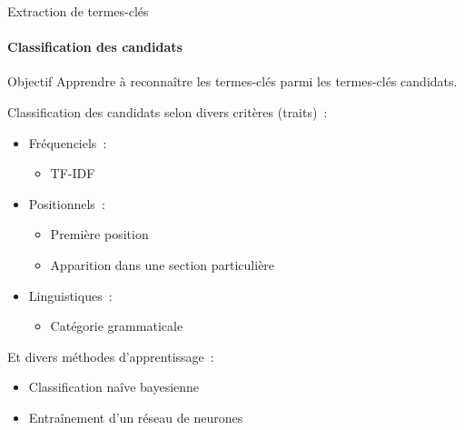   \begin{frame}{Extraction de termes-clés}\framesubtitle{Classification des candidats}
    \begin{block}{Objectif}
      Apprendre à reconnaître les termes-clés parmi les termes-clés candidats.
    \end{block}

    \vspace{1em}

    Classification des candidats selon divers critères (traits)~:
    \begin{itemize}
      \item{Fréquenciels~:}
      \begin{itemize}
        \item{TF-IDF~\cite[KEA]{witten1999kea}}
      \end{itemize}
      \item{Positionnels~:}
      \begin{itemize}
        \item{Première position~\cite[KEA]{witten1999kea}}
        \item{Apparition dans une section
              particulière~\cite{nguyen2007keadocumentstructure}}
      \end{itemize}
      \item{Linguistiques~:}
      \begin{itemize}
        \item{Catégorie grammaticale}
      \end{itemize}
    \end{itemize}

    \vspace{1em}

    Et divers méthodes d'apprentissage~:
    \begin{itemize}
      \item{Classification naîve bayesienne~\cite[KEA]{witten1999kea}}
      \item{Entraînement d'un réseau de neurones~\cite{sarkar2010neuralnetwork}}
    \end{itemize}
  \end{frame}

